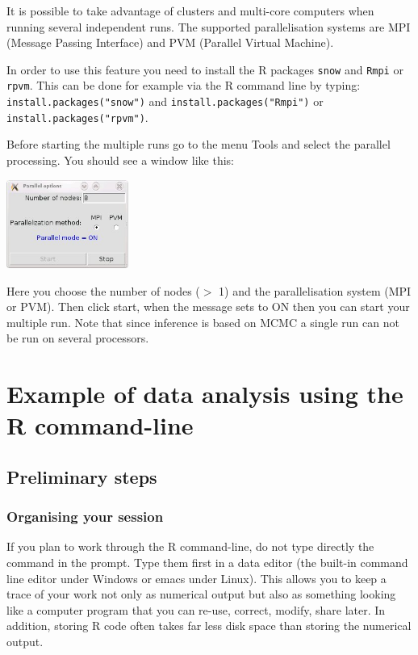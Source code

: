 \documentclass[a4paper,10pt]{article}
\begin{document}
It is possible to take advantage of clusters and multi-core computers when running several independent runs. 
The supported parallelisation systems are MPI (Message Passing Interface) and PVM (Parallel Virtual Machine).

In order to use this feature you need to install the  R packages \texttt{snow} and \texttt{Rmpi} or \texttt{rpvm}.
This can be done for example via the  R command line by typing:
\texttt{install.packages("snow")}  and  
\texttt{install.packages("Rmpi")} 
or
\texttt{install.packages("rpvm")}.

Before starting the multiple runs go to the menu Tools and select the parallel processing. You should see a window like this:

\centerline{\includegraphics[width=4cm]{./fig/parallel.jpg}}

Here you choose the number of nodes ($>$ 1) and the parallelisation system (MPI or PVM). 
Then click start, when the message sets to ON then you can start your multiple run. 
Note that since inference is based on MCMC a  single run can not be run on several processors.

\clearpage
\section[Examples with the command-line]{Example of data analysis using the R command-line}


  
\subsection{Preliminary steps}

\subsubsection{Organising your session}

If you plan to work through the R command-line, do not type directly the command in the prompt. 
Type them first in a data editor (the built-in command line editor under Windows or emacs under Linux). 
This allows you to keep a trace of your work not only as numerical output but also as something looking like 
a computer program that you can 
re-use, correct, modify, share later. In addition, storing R code often takes far less disk space than storing 
the numerical output.
\end{document}
